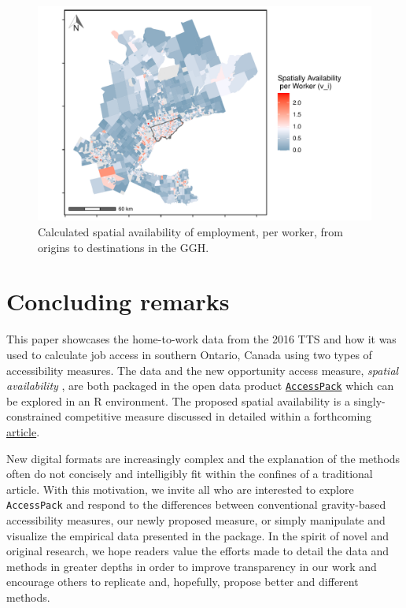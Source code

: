 \documentclass[Royal,times,sageh]{sagej}
\begin{document}
\begin{figure}
\includegraphics[width=1\linewidth]{Manuscript-Data-Package_files/figure-latex/plot-avail-GGH-TTS-per-worker-1} \caption{\label{fig:plot-avail-GGH-TTS-per-worker}Calculated spatial availability of employment, per worker, from origins to destinations in the GGH.}\label{fig:plot-avail-GGH-TTS-per-worker}
\end{figure}

\newpage

\hypertarget{concluding-remarks}{%
\section{Concluding remarks}\label{concluding-remarks}}

This paper showcases the home-to-work data from the 2016 TTS and how it
was used to calculate job access in southern Ontario, Canada using two
types of accessibility measures. The data and the new opportunity access
measure, \emph{spatial availability} , are both packaged in the open
data product
\href{https://github.com/soukhova/AccessPack}{\texttt{AccessPack}} which
can be explored in an R environment. The proposed spatial availability
is a singly-constrained competitive measure discussed in detailed within
a forthcoming
\href{https://github.com/soukhova/Spatial-Availability-Measure}{article}.

New digital formats are increasingly complex and the explanation of the
methods often do not concisely and intelligibly fit within the confines
of a traditional article. With this motivation, we invite all who are
interested to explore \texttt{AccessPack} and respond to the differences
between conventional gravity-based accessibility measures, our newly
proposed measure, or simply manipulate and visualize the empirical data
presented in the package. In the spirit of novel and original research,
we hope readers value the efforts made to detail the data and methods in
greater depths in order to improve transparency in our work and
encourage others to replicate and, hopefully, propose better and
different methods.
\end{document}
